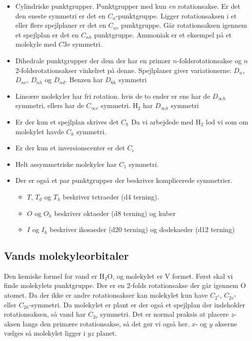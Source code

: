\documentclass[../main.tex]{subfiles}
\begin{document}
\begin{itemize}
    \item Cylindriske punktgrupper. Punktgrupper med kun {\em en} rotationsakse. Er det den eneste symmetri er det en $C_n$-punktgruppe. Ligger rotationsaksen i et eller flere spejlplaner er det en $C_{nv}$ punktgruppe. Går rotationsaksen igennem et spejlplan er det en $C_{nh}$ punktgruppe. Ammoniak er et eksempel på et molekyle med $C{3v}$ symmetri.
    \item Dihedrale punktgrupper der dem der har en primær $n$-foldsrotationsakse og $n$ 2-foldsrotationsakser vinkelret på denne. Spejlplaner giver variationerne: $D_n$, $D_{nv}$, $D_{nh}$ og $D_{nd}$. Benzen har $D_{6h}$ symmetri
    \item Lineære molekyler har fri rotation. hvis de to ender er ens har de $D_{\infty h}$ symmetri, ellers har de $C_{\infty v}$ symmetri. H$_2$ har $D_{\infty h}$ symmetri
    \item Er der kun et spejlplan skrives det $C_h$ Da vi arbejdede med H$_2$ lod vi som om molekylet havde $C_h$ symmetri.
    \item Er der kun et inversionscenter er det $C_i$
    \item Helt assymmetriske molekyler har $C_1$ symmetri.
    \item Der er også et par punktgrupper der beskriver komplicerede symmetrier. 
    \begin{itemize}
    \item $T$, $T_d$ og $T_h$ beskriver tetraeder  (d4 terning).
    \item $O$ og $O_h$ beskriver oktaeder (d8 terning) og kuber
    \item $I$ og $I_h$ beskriver ikosaeder (d20 terning) og dodekaeder (d12 terning)
    \end{itemize}
\end{itemize}

\subsection{Vands molekyleorbitaler}
Den kemiske formel for vand er H$_2$O, og molekylet er V formet. Først skal vi finde molekylets punktgruppe. Der er en 2-folds rotationsakse der går igennem O atomet. Da der ikke er andre rotationsakser kan molekylet kun have $C_2$-, $C_{2v}$- eller $C_{2h}$-symmetri. Da molekylet er plant er der også et spejlplan der indeholder rotationsaksen, så vand har $C_{2v}$ symmetri. Det er normal praksis at placere $z$-aksen langs den primære rotationsakse, så det gør vi også her. $x$- og $y$ akserne vælges så molekylet ligger i $yz$ planet.
\end{document}
